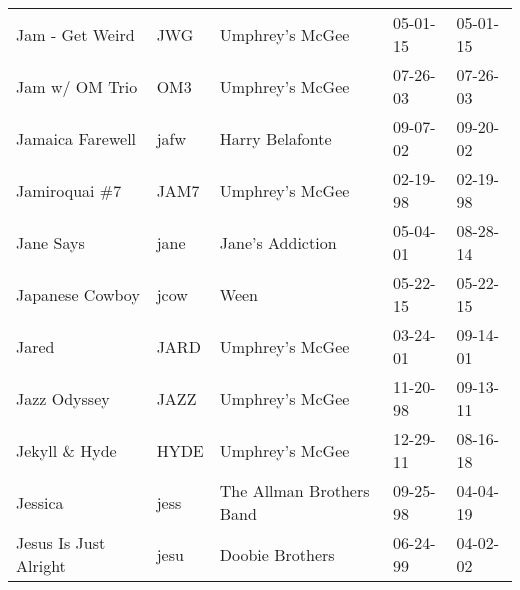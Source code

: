 \begin{longtable}{p{}p{}p{}p{}p{}}
                                                         Jam - Get Weird &           JWG &                                          Umphrey's McGee &              05-01-15 &             05-01-15 \\
                                                          Jam w/ OM Trio &           OM3 &                                          Umphrey's McGee &              07-26-03 &             07-26-03 \\
                                                        Jamaica Farewell &          jafw &                                          Harry Belafonte &              09-07-02 &             09-20-02 \\
                                                          Jamiroquai \#7 &          JAM7 &                                          Umphrey's McGee &              02-19-98 &             02-19-98 \\
                                                               Jane Says &          jane &                                         Jane's Addiction &              05-04-01 &             08-28-14 \\
                                                         Japanese Cowboy &          jcow &                                                     Ween &              05-22-15 &             05-22-15 \\
                                                                   Jared &          JARD &                                          Umphrey's McGee &              03-24-01 &             09-14-01 \\
                                                            Jazz Odyssey &          JAZZ &                                          Umphrey's McGee &              11-20-98 &             09-13-11 \\
                                                          Jekyll \& Hyde &          HYDE &                                          Umphrey's McGee &              12-29-11 &             08-16-18 \\
                                                                 Jessica &          jess &                                 The Allman Brothers Band &              09-25-98 &             04-04-19 \\
                                                   Jesus Is Just Alright &          jesu &                                          Doobie Brothers &              06-24-99 &             04-02-02 \\

\end{longtable}

